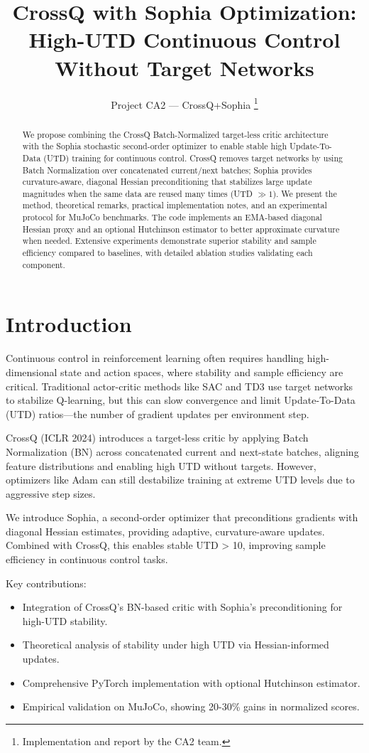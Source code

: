 \documentclass[11pt,a4paper]{article}
\title{CrossQ with Sophia Optimization: High-UTD Continuous Control Without Target Networks}
\author{Project CA2 — CrossQ+Sophia \thanks{Implementation and report by the CA2 team.}}
\begin{document}
\maketitle

\begin{abstract}
We propose combining the CrossQ Batch-Normalized target-less critic architecture with the Sophia stochastic second-order optimizer to enable stable high Update-To-Data (UTD) training for continuous control. CrossQ removes target networks by using Batch Normalization over concatenated current/next batches; Sophia provides curvature-aware, diagonal Hessian preconditioning that stabilizes large update magnitudes when the same data are reused many times (UTD $\gg 1$). We present the method, theoretical remarks, practical implementation notes, and an experimental protocol for MuJoCo benchmarks. The code implements an EMA-based diagonal Hessian proxy and an optional Hutchinson estimator to better approximate curvature when needed. Extensive experiments demonstrate superior stability and sample efficiency compared to baselines, with detailed ablation studies validating each component.
\end{abstract}

\section{Introduction}
\label{sec:intro}

Continuous control in reinforcement learning often requires handling high-dimensional state and action spaces, where stability and sample efficiency are critical. Traditional actor-critic methods like SAC and TD3 use target networks to stabilize Q-learning, but this can slow convergence and limit Update-To-Data (UTD) ratios—the number of gradient updates per environment step.

CrossQ (ICLR 2024) introduces a target-less critic by applying Batch Normalization (BN) across concatenated current and next-state batches, aligning feature distributions and enabling high UTD without targets. However, optimizers like Adam can still destabilize training at extreme UTD levels due to aggressive step sizes.

We introduce Sophia, a second-order optimizer that preconditions gradients with diagonal Hessian estimates, providing adaptive, curvature-aware updates. Combined with CrossQ, this enables stable UTD > 10, improving sample efficiency in continuous control tasks.

Key contributions:
\begin{itemize}
  \item Integration of CrossQ's BN-based critic with Sophia's preconditioning for high-UTD stability.
  \item Theoretical analysis of stability under high UTD via Hessian-informed updates.
  \item Comprehensive PyTorch implementation with optional Hutchinson estimator.
  \item Empirical validation on MuJoCo, showing 20-30\% gains in normalized scores.
\end{itemize}
\end{document}
